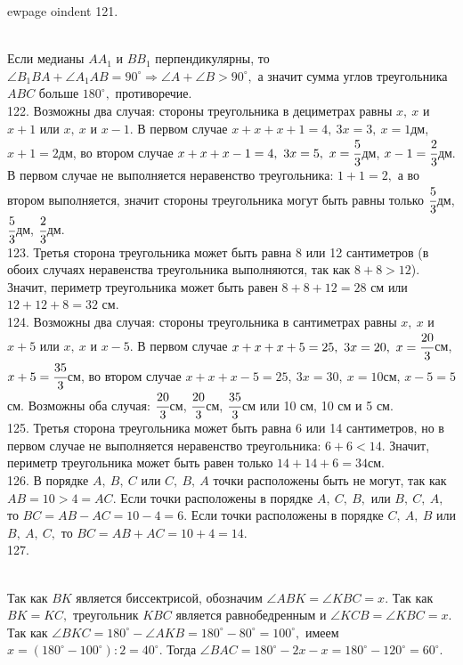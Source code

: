 ewpage
oindent
121. \begin{figure}[ht!]
\end{figure}\\
Если медианы $AA_1$ и $BB_1$ перпендикулярны, то $\angle B_1BA+\angle A_1AB=90^\circ\Rightarrow\angle A+\angle B>90^\circ,$ а значит сумма углов треугольника $ABC$ больше $180^\circ,$ противоречие.\\
122. Возможны два случая: стороны треугольника в дециметрах равны $x,\ x$ и $x+1$ или $x,\ x$ и $x-1.$ В первом случае $x+x+x+1=4,\ 3x=3,\ x=1$дм, $x+1=2$дм, во втором случае $x+x+x-1=4,\ 3x=5,\ x=\cfrac{5}{3}$дм, $x-1=\cfrac{2}{3}$дм. В первом случае не выполняется неравенство треугольника: $1+1=2,$ а во втором выполняется, значит стороны треугольника могут быть равны только $\cfrac{5}{3}$дм, $\cfrac{5}{3}$дм, $\cfrac{2}{3}$дм.\\
123. Третья сторона треугольника может быть равна 8 или 12 сантиметров (в обоих случаях неравенства треугольника выполняются, так как $8+8>12$). Значит, периметр треугольника может быть равен $8+8+12=28$ см или $12+12+8=32$ см.\\
124. Возможны два случая: стороны треугольника в сантиметрах равны $x,\ x$ и $x+5$ или $x,\ x$ и $x-5.$ В первом случае $x+x+x+5=25,\ 3x=20,\ x=\cfrac{20}{3}$см, $x+5=\cfrac{35}{3}$см, во втором случае $x+x+x-5=25,\ 3x=30,\ x=10$см, $x-5=5$см. Возможны оба случая: $\cfrac{20}{3}$см, $\cfrac{20}{3}$см, $\cfrac{35}{3}$см или 10 см, 10 см и 5 см.\\
125. Третья сторона треугольника может быть равна 6 или 14 сантиметров, но в первом случае не выполняется неравенство треугольника: $6+6<14.$ Значит, периметр треугольника может быть равен только $14+14+6=34$см.\\
126. В порядке $A,\ B,\ C$ или $C,\ B,\ A$ точки расположены быть не могут, так как $AB=10>4=AC.$ Если точки расположены в порядке $A,\ C,\ B,$ или $B,\ C,\ A,$ то $BC=AB-AC=10-4=6.$ Если точки расположены в порядке $C,\ A,\ B$ или $B,\ A,\ C,$ то $BC=AB+AC=10+4=14.$\\
127. \begin{figure}[ht!]
\end{figure}\\
Так как $BK$ является биссектрисой, обозначим $\angle ABK=\angle KBC=x.$ Так как $BK=KC,$ треугольник $KBC$ является равнобедренным и $\angle KCB=\angle KBC=x.$ Так как $\angle BKC=180^\circ-\angle AKB=180^\circ-80^\circ=100^\circ,$ имеем $x=(180^\circ-100^\circ):2=40^\circ.$ Тогда $\angle BAC=180^\circ-2x-x=180^\circ-120^\circ=60^\circ.$\\
